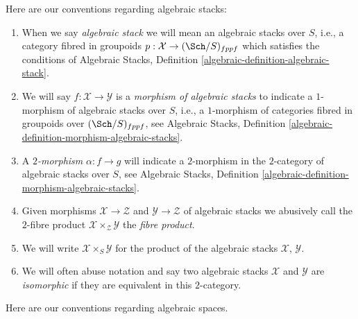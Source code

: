 \medskip\noindent
Here are our conventions regarding algebraic stacks:
\begin{enumerate}
\item When we say {\it algebraic stack} we will mean an algebraic
stacks over $S$, i.e., a category fibred in groupoids
$p : \mathcal{X} \to (\Sch/S)_{fppf}$
which satisfies the conditions of
Algebraic Stacks, Definition \ref{algebraic-definition-algebraic-stack}.
\item We will say $f : \mathcal{X} \to \mathcal{Y}$ is a
{\it morphism of algebraic stacks} to indicate a $1$-morphism
of algebraic stacks over $S$, i.e., a $1$-morphism of categories fibred
in groupoids over $(\Sch/S)_{fppf}$, see
Algebraic Stacks,
Definition \ref{algebraic-definition-morphism-algebraic-stacks}.
\item A {\it $2$-morphism} $\alpha : f \to g$ will
indicate a $2$-morphism in the $2$-category of algebraic stacks over
$S$, see
Algebraic Stacks,
Definition \ref{algebraic-definition-morphism-algebraic-stacks}.
\item Given morphisms $\mathcal{X} \to \mathcal{Z}$
and $\mathcal{Y} \to \mathcal{Z}$ of algebraic stacks
we abusively call the $2$-fibre product
$\mathcal{X} \times_\mathcal{Z} \mathcal{Y}$ the {\it fibre product}.
\item We will write $\mathcal{X} \times_S \mathcal{Y}$ for the
product of the algebraic stacks $\mathcal{X}$, $\mathcal{Y}$.
\item We will often abuse notation and say two algebraic stacks
$\mathcal{X}$ and $\mathcal{Y}$ are {\it isomorphic} if they are
equivalent in this $2$-category.
\end{enumerate}
Here are our conventions regarding algebraic spaces.
